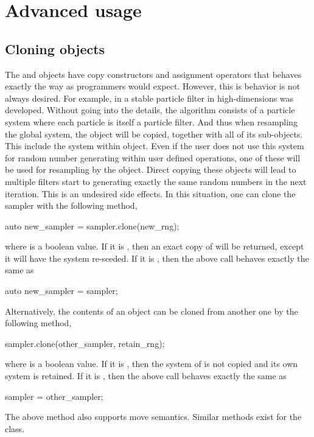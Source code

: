 \section{Advanced usage}
\label{sec:Advanced usage}

\subsection{Cloning objects}
\label{sub:Cloning objects}

The  and  objects have copy
constructors and assignment operators that behaves exactly the way as \cpp
programmers would expect. However, this is behavior is not always desired. For
example, in \textcite{stpf} a stable particle filter in high-dimensions was
developed. Without going into the details, the algorithm consists of a particle
system where each particle is itself a particle filter. And thus when
resampling the global system, the  object will be copied,
together with all of its sub-objects. This include the \rng system within
 object. Even if the user does not use this \rng system
for random number generating within user defined operations, one of these \rng
will be used for resampling by the  object. Direct
copying these  objects will lead to multiple filters
start to generating exactly the same random numbers in the next iteration. This
is an undesired side effects. In this situation, one can clone the sampler with
the following method,
\begin{cppcode}
  auto new_sampler = sampler.clone(new_rng);
\end{cppcode}
where  is a boolean value. If it is , then
an exact copy of  will be returned, except it will have the
\rng system re-seeded. If it is , then the above call behaves
exactly the same as
\begin{cppcode}
  auto new_sampler = sampler;
\end{cppcode}
Alternatively, the contents of an  object can be cloned
from another one by the following method,
\begin{cppcode}
  sampler.clone(other_sampler, retain_rng);
\end{cppcode}
where  is a boolean value. If it is ,
then the \rng system of  is not copied and its own
\rng system is retained. If it is , then the above call
behaves exactly the same as
\begin{cppcode}
  sampler = other_sampler;
\end{cppcode}
The above method also supports move semantics. Similar 
methods exist for the  class.

